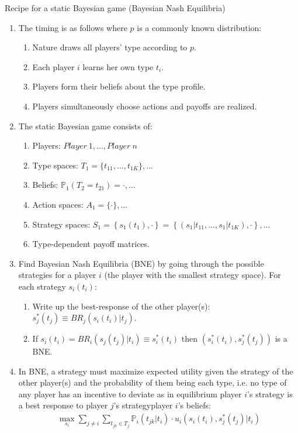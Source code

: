 \begin{frame}{Recipe for a static Bayesian game (Bayesian Nash Equilibria)}
    \begin{enumerate}
      \item The timing is as follows where $p$ is a commonly known distribution:
      \begin{enumerate}\normalsize
        \item Nature draws all players' type according to $p$.
        \item Each player $i$ learns her own type $t_{i}$.
        \item Players form their beliefs about the type profile.
        \item Players simultaneously choose actions and payoffs are realized.
      \end{enumerate}
      \item The static Bayesian game consists of:
      \begin{enumerate}\normalsize
        \item Players: $Player\ 1,...,Player\ n$
        \item Type spaces: $T_1=\{t_{11},...,t_{1K}\},...$
        \item Beliefs: $\mathbb{P}_1(T_2=t_{21})=\cdot,...$
        \item Action spaces: $A_1=\{\cdot\},...$
        \item Strategy spaces: $S_1=\left\{s_1(t_1),\cdot\right\}=\left\{(s_1|t_{11},...,s_1|t_{1K}),\cdot\right\},...$
        \item Type-dependent payoff matrices.
      \end{enumerate}
      \item Find Bayesian Nash Equilibria (BNE) by going through the possible strategies for a player $i$ (the player with the smallest strategy space). For each strategy $s_i(t_i)$:
      \begin{enumerate}\normalsize
        \item Write up the best-response of the other player(s): $s_j^*(t_j)\equiv BR_j\left(s_i(t_i)|t_j\right)$.
        \item If $s_i(t_i)=BR_i\left(s_j(t_j)|t_i\right)\equiv s_i^*(t_i)$ then $\left(s_i^*(t_i),s_j^*(t_j)\right)$ is a BNE.
      \end{enumerate}
      \item In BNE, a strategy must maximize expected utility given the strategy of the other player(s) and the probability of them being each type, i.e. no type of any player has an incentive to deviate as in equilibrium player $i$'s strategy is a best response to player $j$'s strategy\textbar player $i$'s beliefs:
      \begin{align*}
        \max\limits_{s_i}\sum\limits_{j\neq i}\sum\limits_{t_{jk}\in T_j}\mathbb{P}_i(t_{jk}|t_i)\cdot u_i\left(s_i(t_i),s_j^*(t_j)|t_i\right)
      \end{align*}
    \end{enumerate}
    \vfill\null
\end{frame}



